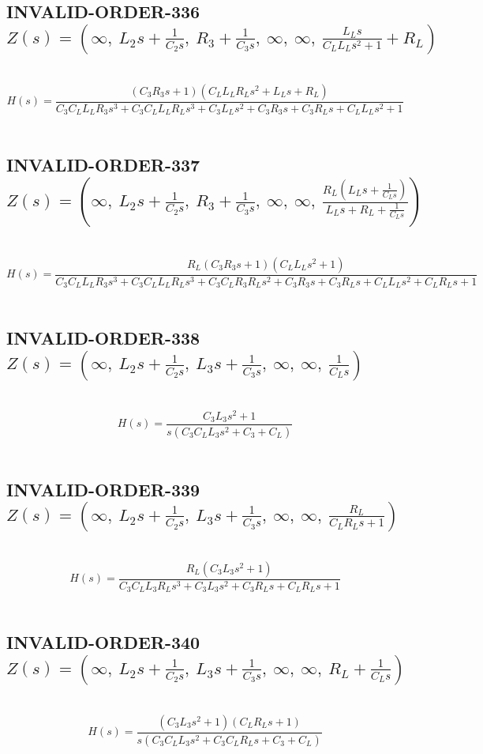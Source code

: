 \documentclass{article}
\begin{document}
\subsection{INVALID-ORDER-336 $Z(s) = \left( \infty, \  L_{2} s + \frac{1}{C_{2} s}, \  R_{3} + \frac{1}{C_{3} s}, \  \infty, \  \infty, \  \frac{L_{L} s}{C_{L} L_{L} s^{2} + 1} + R_{L}\right)$ } \ 
\textbf{\[H(s) = \frac{\left(C_{3} R_{3} s + 1\right) \left(C_{L} L_{L} R_{L} s^{2} + L_{L} s + R_{L}\right)}{C_{3} C_{L} L_{L} R_{3} s^{3} + C_{3} C_{L} L_{L} R_{L} s^{3} + C_{3} L_{L} s^{2} + C_{3} R_{3} s + C_{3} R_{L} s + C_{L} L_{L} s^{2} + 1}\] } \ 
\subsection{INVALID-ORDER-337 $Z(s) = \left( \infty, \  L_{2} s + \frac{1}{C_{2} s}, \  R_{3} + \frac{1}{C_{3} s}, \  \infty, \  \infty, \  \frac{R_{L} \left(L_{L} s + \frac{1}{C_{L} s}\right)}{L_{L} s + R_{L} + \frac{1}{C_{L} s}}\right)$ } \ 
\textbf{\[H(s) = \frac{R_{L} \left(C_{3} R_{3} s + 1\right) \left(C_{L} L_{L} s^{2} + 1\right)}{C_{3} C_{L} L_{L} R_{3} s^{3} + C_{3} C_{L} L_{L} R_{L} s^{3} + C_{3} C_{L} R_{3} R_{L} s^{2} + C_{3} R_{3} s + C_{3} R_{L} s + C_{L} L_{L} s^{2} + C_{L} R_{L} s + 1}\] } \ 
\subsection{INVALID-ORDER-338 $Z(s) = \left( \infty, \  L_{2} s + \frac{1}{C_{2} s}, \  L_{3} s + \frac{1}{C_{3} s}, \  \infty, \  \infty, \  \frac{1}{C_{L} s}\right)$ } \ 
\textbf{\[H(s) = \frac{C_{3} L_{3} s^{2} + 1}{s \left(C_{3} C_{L} L_{3} s^{2} + C_{3} + C_{L}\right)}\] } \ 
\subsection{INVALID-ORDER-339 $Z(s) = \left( \infty, \  L_{2} s + \frac{1}{C_{2} s}, \  L_{3} s + \frac{1}{C_{3} s}, \  \infty, \  \infty, \  \frac{R_{L}}{C_{L} R_{L} s + 1}\right)$ } \ 
\textbf{\[H(s) = \frac{R_{L} \left(C_{3} L_{3} s^{2} + 1\right)}{C_{3} C_{L} L_{3} R_{L} s^{3} + C_{3} L_{3} s^{2} + C_{3} R_{L} s + C_{L} R_{L} s + 1}\] } \ 
\subsection{INVALID-ORDER-340 $Z(s) = \left( \infty, \  L_{2} s + \frac{1}{C_{2} s}, \  L_{3} s + \frac{1}{C_{3} s}, \  \infty, \  \infty, \  R_{L} + \frac{1}{C_{L} s}\right)$ } \ 
\textbf{\[H(s) = \frac{\left(C_{3} L_{3} s^{2} + 1\right) \left(C_{L} R_{L} s + 1\right)}{s \left(C_{3} C_{L} L_{3} s^{2} + C_{3} C_{L} R_{L} s + C_{3} + C_{L}\right)}\] } \ 
\end{document}
